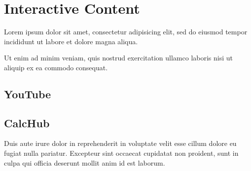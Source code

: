 
\chapter{Interactive Content}
Lorem ipsum dolor sit amet, consectetur adipisicing elit, sed do eiusmod tempor incididunt ut labore et dolore magna aliqua.

Ut enim ad minim veniam, quis nostrud exercitation ullamco laboris nisi ut aliquip ex ea commodo consequat.

\section{YouTube}


\section{CalcHub}

Duis aute irure dolor in reprehenderit in voluptate velit esse cillum dolore eu fugiat nulla pariatur. Excepteur sint occaecat cupidatat non proident, sunt in culpa qui officia deserunt mollit anim id est laborum. 



